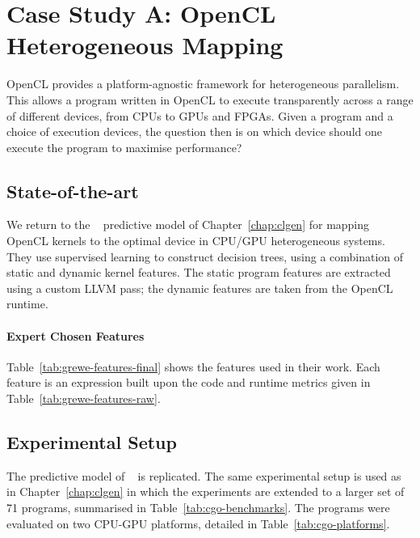 \section{Case Study A: OpenCL Heterogeneous Mapping}
\label{sec:deeptune-case-study-a}

OpenCL provides a platform-agnostic framework for heterogeneous parallelism. This allows a program written in OpenCL to execute transparently across a range of different devices, from CPUs to GPUs and FPGAs. Given a program and a choice of execution devices, the question then is on which device should one execute the program to maximise performance?

\subsection{State-of-the-art}

We return to the \citeauthor{Grewe2013}~\cite{Grewe2013} predictive model of Chapter~\ref{chap:clgen} for mapping OpenCL kernels to the optimal device in CPU/GPU heterogeneous systems. They use supervised learning to construct decision trees, using a combination of static and dynamic kernel features. The static program features are extracted using a custom LLVM pass; the dynamic features are taken from the OpenCL runtime.

\paragraph*{Expert Chosen Features}

Table~\ref{tab:grewe-features-final} shows the features used in their work. Each feature is an expression built upon the code and runtime metrics given in Table~\ref{tab:grewe-features-raw}.



\subsection{Experimental Setup}

The predictive model of \citeauthor{Grewe2013}~\cite{Grewe2013} is replicated. The same experimental setup is used as in Chapter~\ref{chap:clgen} in which the experiments are extended to a larger set of 71 programs, summarised in Table~\ref{tab:cgo-benchmarks}. The programs were evaluated on two CPU-GPU platforms, detailed in Table~\ref{tab:cgo-platforms}.

